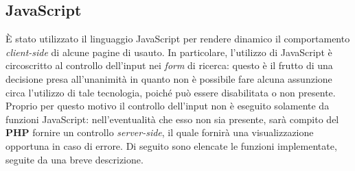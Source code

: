 	\subsection{JavaScript}
	\par \`E stato utilizzato il linguaggio JavaScript per rendere dinamico il comportamento \textit{client-side} di alcune pagine di usauto. In particolare, l'utilizzo di JavaScript è circoscritto al controllo dell'input nei \textit{form} di ricerca: questo è il frutto di una decisione presa all'unanimità in quanto non è possibile fare alcuna assunzione circa l'utilizzo di tale tecnologia, poiché può essere disabilitata o non presente. Proprio per questo motivo il controllo dell'input non è eseguito solamente da funzioni JavaScript: nell'eventualità che esso non sia presente, sarà compito del \textbf{PHP} fornire un controllo \textit{server-side}, il quale fornirà una visualizzazione opportuna in caso di errore. Di seguito sono elencate le funzioni implementate, seguite da una breve descrizione.
	\oniontable
